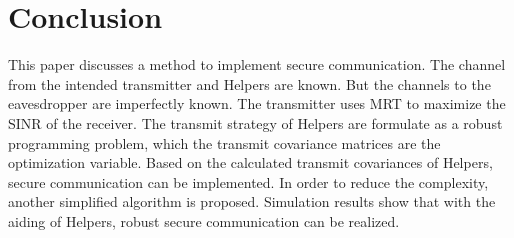 \documentclass[conference]{IEEEtran}
\begin{document}
%






\section{Conclusion} \label{sec:conclusion}
This paper discusses a method to implement secure communication. The channel from the intended transmitter and Helpers are known. But the channels to the eavesdropper are imperfectly known. The transmitter uses MRT to maximize the SINR of the receiver. The transmit strategy of Helpers are formulate as a robust programming problem, which the transmit covariance matrices are the optimization variable. Based on the calculated transmit covariances of Helpers, secure communication can be implemented. In order to reduce the complexity, another simplified algorithm is proposed. Simulation results show that with the aiding of Helpers, robust secure communication can be realized.
\end{document}
